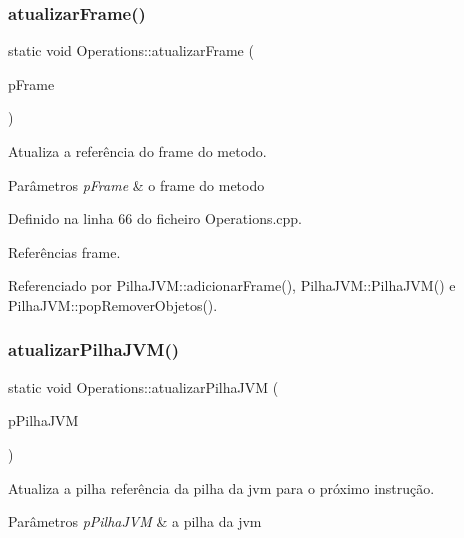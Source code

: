 \subsubsection{\texorpdfstring{atualizar\+Frame()}{atualizarFrame()}}
{\footnotesize\ttfamily static void Operations\+::atualizar\+Frame (\begin{DoxyParamCaption}\item[{struct \hyperlink{structframe__s}{frame\+\_\+s} $\ast$}]{p\+Frame }\end{DoxyParamCaption})\hspace{0.3cm}{\ttfamily [static]}}



Atualiza a referência do frame do metodo. 


\begin{DoxyParams}{Parâmetros}
{\em p\+Frame} & o frame do metodo \\
\hline
\end{DoxyParams}


Definido na linha 66 do ficheiro Operations.\+cpp.



Referências frame.



Referenciado por Pilha\+J\+V\+M\+::adicionar\+Frame(), Pilha\+J\+V\+M\+::\+Pilha\+J\+V\+M() e Pilha\+J\+V\+M\+::pop\+Remover\+Objetos().

\mbox{\label{classOperations_a5b31ab2923ed10b6ad3705f9954ed49e}} 
\subsubsection{\texorpdfstring{atualizar\+Pilha\+J\+V\+M()}{atualizarPilhaJVM()}}
{\footnotesize\ttfamily static void Operations\+::atualizar\+Pilha\+J\+VM (\begin{DoxyParamCaption}\item[{\hyperlink{classPilhaJVM}{Pilha\+J\+VM} $\ast$}]{p\+Pilha\+J\+VM }\end{DoxyParamCaption})\hspace{0.3cm}{\ttfamily [static]}}



Atualiza a pilha referência da pilha da jvm para o próximo instrução. 


\begin{DoxyParams}{Parâmetros}
{\em p\+Pilha\+J\+VM} & a pilha da jvm \\
\hline
\end{DoxyParams}


